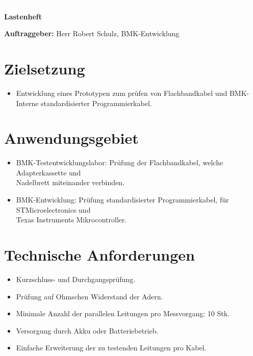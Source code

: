 \documentclass[a4paper,11pt]{scrartcl}
\begin{document}
\begin{center}
	\begin{huge}
	\textcolor{white}{\tiny{Platzhalter wenn ein Kapitel auf einer neuen Seite beginnt\\}}
	\textbf{Lastenheft}
	\end{huge}
\end{center}

\textbf{Auftraggeber:}
Herr Robert Schulz, BMK-Entwicklung


\section{Zielsetzung}

\begin{itemize}
	\item{Entwicklung eines Prototypen zum prüfen von Flachbandkabel und BMK-Interne standardisierter Programmierkabel.}
\end{itemize}

\section{Anwendungsgebiet}

\begin{itemize}
	\item{BMK-Testentwicklungslabor: Prüfung der Flachbandkabel, welche Adapterkassette und \\ Nadelbrett miteinander verbinden.}
	
	\item{BMK-Entwicklung: Prüfung standardisierter Programmierkabel, für STMicroelectronics und \\ Texas Instruments Mikrocontroller.}
\end{itemize}

\section{Technische Anforderungen}

\begin{itemize}
	\item{Kurzschluss- und Durchgangsprüfung.}
	\item{Prüfung auf Ohmschen Widerstand der Adern.}
	\item{Minimale Anzahl der parallelen Leitungen pro Messvorgang: 10 Stk.}
	\item{Versorgung durch Akku oder Batteriebetrieb.}
	\item{Einfache Erweiterung der zu testenden Leitungen pro Kabel.}
\end{itemize}
\end{document}

